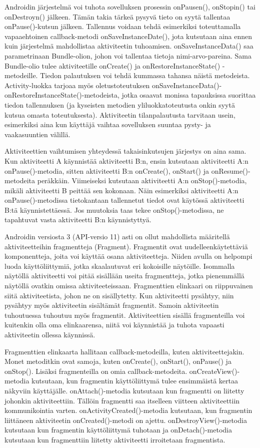 Androidin järjestelmä voi tuhota sovelluksen prosessin onPausen(), onStopin() tai onDestroyn() jälkeen. Tämän takia tärkeä pysyvä tieto on syytä tallentaa onPause()-kutsun jälkeen. Tallennus voidaan tehdä esimerkiksi toteuttamalla vapaaehtoinen callback-metodi onSaveInstanceDate(), jota kutsutaan aina ennen kuin järjestelmä mahdollistaa aktiviteetin tuhoamisen. onSaveInstanceData() saa parametrinaan Bundle-olion, johon voi tallentaa tietoja nimi-arvo-pareina. Sama Bundle-olio tulee aktiviteetille onCreate() ja onRestoreInstanceState() -metodeille. Tiedon palautuksen voi tehdä kummassa tahansa näistä metodeista. Activity-luokka tarjoaa myös oletustoteutuksen onSaveInstanceData()- onRestoreInstanceState()-metodeista, jotka osaavat monissa tapauksissa suorittaa tiedon tallennuksen (ja kyseisten metodien yliluokkatoteutusta onkin syytä kutsua omasta toteutuksesta). Aktiviteetin tilanpalautusta tarvitaan usein, esimerkiksi aina kun käyttäjä vaihtaa sovelluksen suuntaa pysty- ja vaakasuuntien välillä.

Aktiviteettien vaihtumisen yhteydessä takaisinkutsujen järjestys on aina sama. Kun aktiviteetti A käynnistää aktiviteetti B:n, ensin kutsutaan aktiviteetti A:n onPause()-metodia, sitten aktiviteetti B:n onCreate(), onStart() ja onResume()-metodeita peräkkäin. Viimeiseksi kutsutaan aktiviteetti A:n onStop()-metodia, mikäli aktiviteetti B peittää sen kokonaan. Näin esimerkiksi aktiviteetti A:n onPause()-metodissa tietokantaan tallennetut tiedot ovat käytössä aktiviteetti B:tä käynnistettäessä. Jos muutoksia taas tekee onStop()-metodissa, ne tapahtuvat vasta aktiviteetti B:n käynnistyttyä.

Androidin versiosta 3 (API-versio 11) asti on ollut mahdollista määritellä aktiviteetteihin fragmentteja (Fragment). Fragmentit ovat uudelleenkäytettäviä komponentteja, joita voi käyttää osana aktiviteetteja. Niiden avulla on helpompi luoda käyttöliittymiä, jotka skaalautuvat eri kokoisille näytöille. Isommalla näytöllä aktiviteetti voi pitää sisällään useita fragmentteja, jotka pienemmällä näytöllä ovatkin omissa aktiviteeteissaan. Fragmenttien elinkaari on riippuvainen siitä aktiviteetista, johon ne on sisällytetty. Kun aktiviteetti pysähtyy, niin pysähtyy myös aktiviteetin sisältämät fragmentit. Samoin aktiviteetin tuhoutuessa tuhoutuu myös fragmentit. Aktiviteettien sisällä fragmenteilla voi kuitenkin olla oma elinkaarensa, niitä voi käynnistää ja tuhota vapaasti aktiviteetin ollessa käynnissä.

Fragmenttien elinkaarta hallitaan callback-metodeilla, kuten aktiviteettejakin. Monet metoditkin ovat samoja, kuten onCreate(), onStart(), onPause() ja onStop(). Lisäksi fragmenteilla on omia callback-metodeita. onCreateView()-metodia kutsutaan, kun fragmentin käyttöliittymä tulee ensimmäistä kertaa näkyviin käyttäjälle. onAttach()-metodia kutsutaan kun fragmentti on liitetty johonkin aktiviteettiin. Tällöin fragmentti saa itselleen viitteen aktiviteettiin kommunikointia varten. onActivityCreated()-metodia kutsutaan, kun fragmentin liittäneen aktiviteetin onCreated()-metodi on ajettu. onDestroyView()-metodia kutsutaan kun fragmentin käyttöliittymä tuhotaan ja onDetach()-metodia kutsutaan kun fragmenttiin liitetty aktiviteetti irroitetaan fragmentista.

